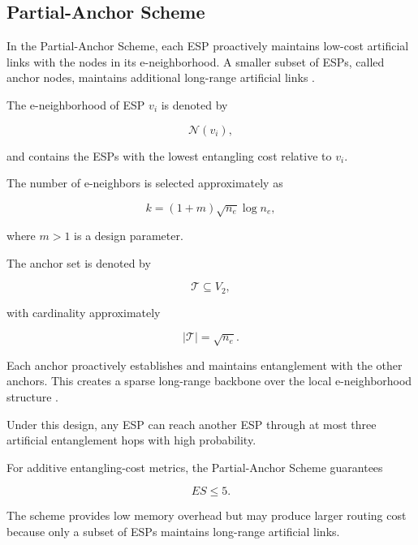 \subsection{Partial-Anchor Scheme}

In the Partial-Anchor Scheme, each ESP proactively maintains low-cost artificial links with the nodes in its e-neighborhood. A smaller subset of ESPs, called anchor nodes, maintains additional long-range artificial links \cite{caleffi2025quantumarchitecture}.

The e-neighborhood of ESP $v_i$ is denoted by

\begin{equation}
    \mathcal{N}(v_i),
\end{equation}

and contains the ESPs with the lowest entangling cost relative to $v_i$.

The number of e-neighbors is selected approximately as

\begin{equation}
    k
    =
    (1+m)
    \sqrt{n_e}
    \log n_e,
\end{equation}

where $m>1$ is a design parameter.

The anchor set is denoted by

\begin{equation}
    \mathcal{T}
    \subseteq
    V_2,
\end{equation}

with cardinality approximately

\begin{equation}
    |\mathcal{T}|
    =
    \sqrt{n_e}.
\end{equation}

Each anchor proactively establishes and maintains entanglement with the other anchors. This creates a sparse long-range backbone over the local e-neighborhood structure \cite{caleffi2025quantumarchitecture}.

Under this design, any ESP can reach another ESP through at most three artificial entanglement hops with high probability.

For additive entangling-cost metrics, the Partial-Anchor Scheme guarantees

\begin{equation}
    ES
    \leq
    5.
\end{equation}

The scheme provides low memory overhead but may produce larger routing cost because only a subset of ESPs maintains long-range artificial links.

